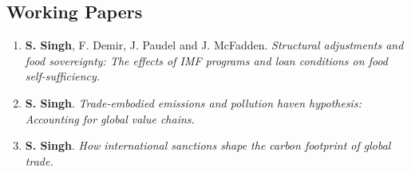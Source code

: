 
\subsection{Working Papers}

\begin{enumerate}
	\item \textbf{S. Singh}, F. Demir, J. Paudel and J. McFadden. \textit{Structural adjustments and food sovereignty: The effects of IMF
programs and loan conditions on food self-sufficiency.}
	\item \textbf{S. Singh}. \textit{Trade-embodied emissions and pollution haven hypothesis: Accounting for global value chains.}
	\item \textbf{S. Singh}. \textit{How international sanctions shape the carbon footprint of global trade.}
	\setcounter{publicationCounter}{\value{enumi}}	%
\end{enumerate}



